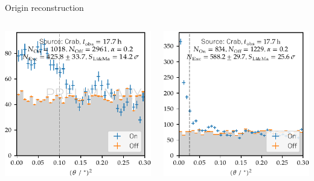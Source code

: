 \begin{frame}[t]{Origin reconstruction}
\begin{columns}[onlytextwidth]
\begin{column}{0.475\textwidth}
    \includegraphics[width=\textwidth]{fig/theta2_plot.pdf}
\end{column}
\hfill%
\begin{column}{0.475\textwidth}
    \includegraphics[width=\textwidth]{fig/theta2.pdf}
\end{column}
\end{columns}
\end{frame}


